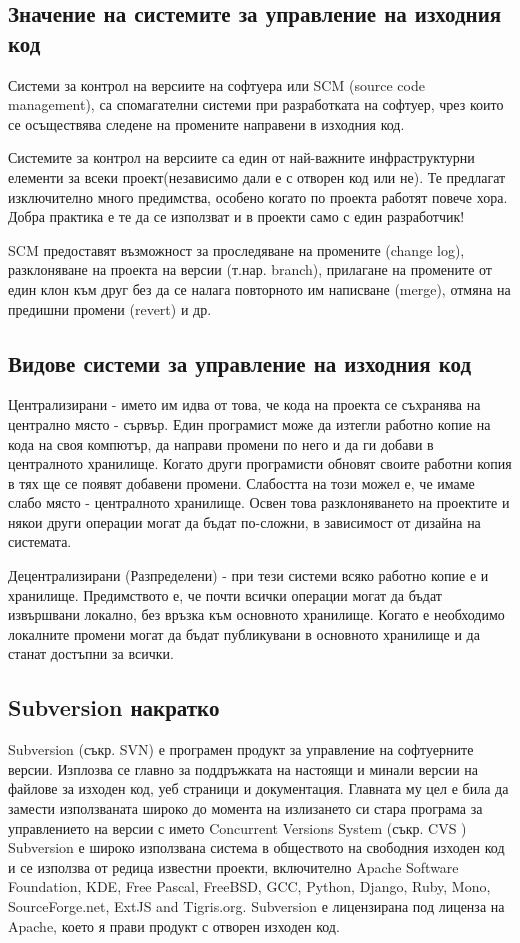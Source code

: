 \subsection{Значение на системите за управление на изходния код}
Системи за контрол на версиите на софтуера или SCM (source code
management), са спомагателни системи при разработката на софтуер, чрез
които се осъществява следене на промените направени в изходния код.

Системите за контрол на версиите са един от най-важните
инфраструктурни елементи за всеки проект(независимо дали е с отворен
код или не). Те предлагат изключително много предимства, особено
когато по проекта работят повече хора. Добра практика е те да се
използват и в проекти само с един разработчик!

SCM предоставят възможност за проследяване на промените (change log),
разклоняване на проекта на версии (т.нар. branch), прилагане на
промените от един клон към друг без да се налага повторното им
написване (merge), отмяна на предишни промени (revert) и др.

\subsection{Видове системи за управление на изходния код}
Централизирани - името им идва от това, че кода на проекта се
съхранява на централно място - сървър. Един програмист може да изтегли
работно копие на кода на своя компютър, да направи промени по него и
да ги добави в централното хранилище. Когато други програмисти обновят
своите работни копия в тях ще се появят добавени промени. Слабостта на
този можел е, че имаме слабо място - централното хранилище. Освен това
разклоняването на проектите и някои други операции могат да бъдат
по-сложни, в зависимост от дизайна на системата.

Децентрализирани (Разпределени) - при тези системи всяко работно копие
е и хранилище. Предимството е, че почти всички операции могат да бъдат
извършвани локално, без връзка към основното хранилище. Когато е
необходимо локалните промени могат да бъдат публикувани в основното
хранилище и да станат достъпни за всички.

\subsection{Subversion накратко}
Subversion (съкр. SVN) е програмен продукт за управление на
софтуерните версии. Изплозва се главно за поддръжката на настоящи и
минали версии на файлове за изходен код, уеб страници и
документация. Главната му цел е била да замести използваната широко до
момента на излизането си стара програма за управлението на версии с
името Concurrent Versions System (съкр. CVS ) Subversion е широко
използвана система в обществото на свободния изходен код и се използва
от редица известни проекти, включително Apache Software Foundation,
KDE, Free Pascal, FreeBSD, GCC, Python, Django, Ruby, Mono,
SourceForge.net, ExtJS and Tigris.org.  Subversion е лицензирана под
лиценза на Apache, което я прави продукт с отворен изходен код.

